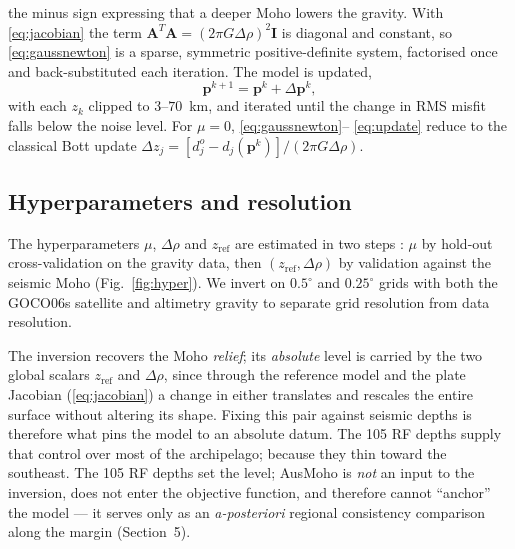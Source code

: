 \documentclass[extra,mreferee]{gji}
\begin{document}
the minus sign expressing that a deeper Moho lowers the gravity. With
\eqref{eq:jacobian} the term $\mathbf{A}^{T}\mathbf{A}=(2\pi G\Delta\rho)^{2}\mathbf{I}$
is diagonal and constant, so \eqref{eq:gaussnewton} is a sparse, symmetric
positive-definite system, factorised once and back-substituted each iteration. The
model is updated,
\begin{equation}
\mathbf{p}^{k+1} = \mathbf{p}^{k} + \Delta\mathbf{p}^{k},
\label{eq:update}
\end{equation}
with each $z_k$ clipped to $3$--$70$~km, and iterated until the change in RMS
misfit falls below the noise level. For $\mu=0$, \eqref{eq:gaussnewton}--%
\eqref{eq:update} reduce to the classical Bott update
$\Delta z_j = [d^{o}_j - d_j(\mathbf{p}^{k})]/(2\pi G\Delta\rho)$.

\subsection{Hyperparameters and resolution}
The hyperparameters $\mu$, $\Delta\rho$ and $z_{\mathrm{ref}}$ are estimated in two
steps \citep{uieda2017}: $\mu$ by hold-out cross-validation on the gravity data,
then $(z_{\mathrm{ref}},\Delta\rho)$ by validation against the seismic Moho
(Fig.~\ref{fig:hyper}). We invert on $0.5^{\circ}$ and $0.25^{\circ}$ grids with
both the {GOCO06s} satellite and altimetry gravity to separate grid resolution
from data resolution.

The inversion recovers the Moho \emph{relief}; its \emph{absolute} level is carried
by the two global scalars $z_{\mathrm{ref}}$ and $\Delta\rho$, since through the
reference model and the plate Jacobian (\ref{eq:jacobian}) a change in either
translates and rescales the entire surface without altering its shape. Fixing this
pair against seismic depths is therefore what pins the model to an absolute datum.
The 105 RF depths supply that control over most of the archipelago; because they
thin toward the southeast. The 105 RF depths set the level; {AusMoho}
\citep{kennett2011} is \emph{not} an input to the inversion, does not enter the
objective function, and therefore cannot ``anchor'' the model --- it serves only as
an \emph{a-posteriori} regional consistency comparison along the margin (Section~5).

\end{document}
